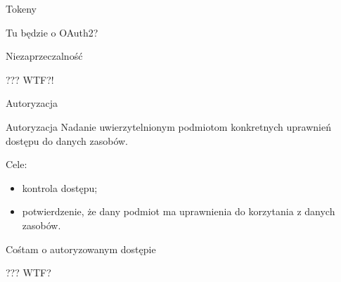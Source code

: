 \begin{frame}{Tokeny}
	
	Tu będzie o OAuth2?
	
\end{frame}

\begin{frame}{Niezaprzeczalność}
	
	??? WTF?!
	
\end{frame}

\begin{frame}{Autoryzacja}
	
	\begin{alertblock}{Autoryzacja}
		Nadanie uwierzytelnionym podmiotom konkretnych uprawnień dostępu do danych zasobów.
	\end{alertblock}
	
	Cele:
	\begin{itemize}
		\item kontrola dostępu;
		\item potwierdzenie, że dany podmiot ma uprawnienia do korzytania z danych zasobów.
	\end{itemize}
	
\end{frame}

\begin{frame}{Cośtam o autoryzowanym dostępie}
	
	??? WTF?
	
\end{frame}


